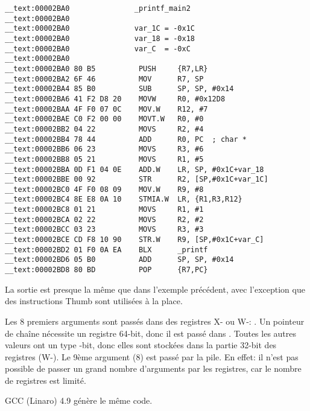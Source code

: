 \myparagraph{\OptimizingXcodeIV: \ThumbTwoMode}

\begin{lstlisting}[style=customasmARM]
__text:00002BA0               _printf_main2
__text:00002BA0
__text:00002BA0               var_1C = -0x1C
__text:00002BA0               var_18 = -0x18
__text:00002BA0               var_C  = -0xC
__text:00002BA0
__text:00002BA0 80 B5          PUSH     {R7,LR}
__text:00002BA2 6F 46          MOV      R7, SP
__text:00002BA4 85 B0          SUB      SP, SP, #0x14
__text:00002BA6 41 F2 D8 20    MOVW     R0, #0x12D8
__text:00002BAA 4F F0 07 0C    MOV.W    R12, #7
__text:00002BAE C0 F2 00 00    MOVT.W   R0, #0
__text:00002BB2 04 22          MOVS     R2, #4
__text:00002BB4 78 44          ADD      R0, PC  ; char *
__text:00002BB6 06 23          MOVS     R3, #6
__text:00002BB8 05 21          MOVS     R1, #5
__text:00002BBA 0D F1 04 0E    ADD.W    LR, SP, #0x1C+var_18
__text:00002BBE 00 92          STR      R2, [SP,#0x1C+var_1C]
__text:00002BC0 4F F0 08 09    MOV.W    R9, #8
__text:00002BC4 8E E8 0A 10    STMIA.W  LR, {R1,R3,R12}
__text:00002BC8 01 21          MOVS     R1, #1
__text:00002BCA 02 22          MOVS     R2, #2
__text:00002BCC 03 23          MOVS     R3, #3
__text:00002BCE CD F8 10 90    STR.W    R9, [SP,#0x1C+var_C]
__text:00002BD2 01 F0 0A EA    BLX      _printf
__text:00002BD6 05 B0          ADD      SP, SP, #0x14
__text:00002BD8 80 BD          POP      {R7,PC}
\end{lstlisting}

La sortie est presque la même que dans l'exemple précédent, avec l'exception que
des instructions Thumb sont utilisées à la place.





Les 8 premiers arguments sont passés dans des registres X- ou W-: \ARMPCS.
Un pointeur de chaîne nécessite un registre 64-bit, donc il est passé dans .
Toutes les autres valeurs ont un type -bit, donc elles sont stockées dans
la partie 32-bit des registres (W-).
Le 9ème argument (8) est passé par la pile.
En effet: il n'est pas possible de passer un grand nombre d'arguments par les registres,
car le nombre de registres est limité.

GCC (Linaro) 4.9 \Optimizing génère le même code.
